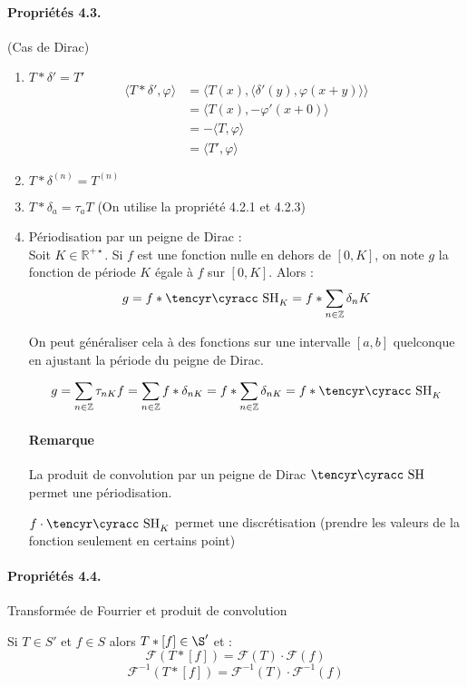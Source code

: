 \documentclass[12pt,a4paper]{report}
\newcommand{\ens}[1]{\ensuremath{\mathbb{#1}}}
\newcommand{\F}{\ensuremath{\mathcal{F}}}
\def\cyr{\tencyr\cyracc}
\def\dc{\mbox{\cyr SH}}
\begin{document}
\paragraph{Propriétés 4.3.} (Cas de Dirac)

\begin{enumerate}
	\item \(T * \delta' = T'\) \begin{align*}
		\langle T * \delta', \varphi \rangle &= \langle T(x), \langle \delta'(y), \varphi(x+y) \rangle \rangle\\
		&= \langle T(x), -\varphi' (x+0) \rangle\\
		&= - \langle T, \varphi \rangle\\
		&= \langle T', \varphi \rangle
	\end{align*}
	
	\item \(T * \delta^{(n)} = T^{(n)}\)
	
	\item \(T * \delta_a = \tau_a T\)
	(On utilise la propriété 4.2.1 et 4.2.3)
	
	\item Périodisation par un peigne de Dirac :\\
	Soit \(K \in \ens{R}^{+\star}\). Si \(f\) est une fonction nulle en dehors de \(\left [0, K\right ]\), on note \(g\) la fonction de période \(K\) égale à \(f\) sur \(\left [0, K\right ]\). Alors :
	\[
		g = f * \dc_K = f * \sum_{n \in \ens{Z}} \delta_n K
	\]
	
	On peut généraliser cela à des fonctions	sur une intervalle \(\left [ a, b \right ]\) quelconque en ajustant la période du peigne de Dirac.
	
	\[
		g = \sum_{n \in \ens{Z}} \tau_{nK} f = \sum_{n \in \ens{Z}} f * \delta_{nK} = f * \sum_{n \in \ens{Z}} \delta_{nK} = f * \dc_K
	\]
	
	\paragraph{Remarque}\quad
	
	La produit de convolution par un peigne de Dirac \(\dc\) permet une périodisation.
	
	\(f \cdot \dc_K\) permet une discrétisation (prendre les valeurs de la fonction seulement en certains point)
\end{enumerate}

\paragraph{Propriétés 4.4.} Transformée de Fourrier et produit de convolution

Si \(T \in S'\) et \(f \in S\) alors \(T * [f] \in \S'\) et :
\[
	\F(T * [f]) = \F(T) \cdot \F(f)
\]
\[
	\F^{-1}(T * [f]) = \F^{-1}(T) \cdot \F^{-1}(f)
\]
\end{document}
